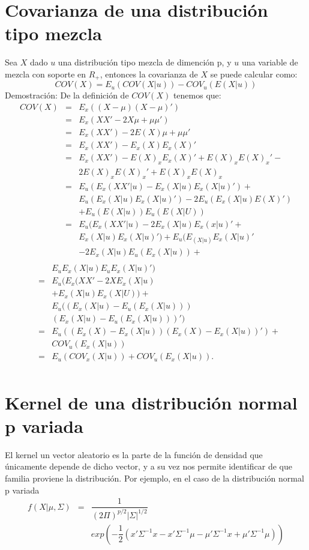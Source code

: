 \section{Covarianza de una distribución tipo mezcla}
Sea $X$ dado $u$ una distribución tipo mezcla de dimención p, y $u$ una variable de mezcla con soporte
en $R_{+}$, entonces la covarianza de $X$ se puede calcular como:
\begin{equation*}
COV(X)=E_{u}(COV(X|u))-COV_{u}(E(X|u))
\end{equation*}
Demostración:
De la definición de $COV(X)$ tenemos que:
\begin{eqnarray*}
COV(X)& = &E_{x}((X-\mu)(X-\mu)') \\
& =&E_{x}(XX'-2X\mu+\mu\mu')\\
& =&E_{x}(XX')-2E(X)\mu+\mu\mu' \\
& =&E_{x}(XX')-E_{x}(X)E_{x}(X)' \\
&= &E_{x}(XX')-E(X)_{x}E_{x}(X)'+E(X)_{x}E(X)_{x}'-\\
& &2E(X)_{x}E(X)_{x}'+E(X)_{x}E(X)_{x}\\
&= &E_{u}(E_{x}(XX'|u)-E_{x}(X|u)E_{x}(X|u)')+\\
& & E_{u}(E_{x}(X|u)E_{x}(X|u)') -2E_{u}(E_{x}(X|u)E(X)')\\
& & +E_{u}(E(X|u))E_{u}(E(X|U))\\
&= &E_{u}(E_{x}(XX'|u)-2E_{x}(X|u)E_{x}(x|u)'+
 \\
& &  E_{x}(X|u)E_{x}(X|u)') + E_{u}(E_(X|u)E_{x}(X|u)'\\
& & -2E_{x}(X|u)E_{u}(E_{x}(X|u))+\\
\end{eqnarray*}
\begin{eqnarray*}
& & E_{u}E_{x}(X|u)E_{u}E_{x}(X|u)') \\
&= &E_{u}(E_{x}(XX'-2XE_{x}(X|u)  \\
& & +E_{x}(X|u)E_{x}(X|U)) + \\
& & E_{u}((E_{x}(X|u)-E_{u}(E_{x}(X|u)))
\\
& & (E_{x}(X|u)-E_{u}(E_{x}(X|u)))')\\
&= &E_{u}((E_{x}(X)-E_{x}(X|u))(E_{x}(X)-E_{x}(X|u))') +  \\
& & COV_{u}(E_{x}(X|u))\\
& =&E_{u}(COV_{x}(X|u)) + COV_{u}(E_{x}(X|u)).
 \\
\end{eqnarray*}

\section{Kernel de una distribución normal p variada}
El kernel un vector aleatorio es la parte de la función de densidad que únicamente depende de dicho vector, y a su vez nos permite identificar de que familia proviene la distribución. Por ejemplo, en el caso de la distribución normal p variada
\begin{eqnarray*}
f(X|\mu,\Sigma)& =& \dfrac{1}{(2\Pi)^{p/2}|\Sigma|^{1/2}}\\
& &exp(-\dfrac{1}{2}(x'\Sigma^{-1}x - x'\Sigma^{-1}\mu -\mu'\Sigma^{-1}x+\mu'\Sigma^{-1}\mu))
 \\
\end{eqnarray*}


